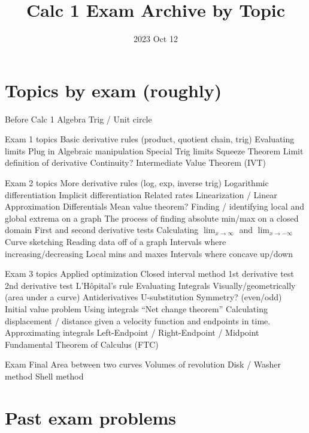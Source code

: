 \documentclass[10pt]{scrartcl}
\title{Calc 1 Exam Archive by Topic}
\date{
  2023 Oct 12 
}
\theoremstyle{definition}
\begin{document}
\maketitle
\tableofcontents

\part{Topics by exam (roughly)}
\begin{outline}
  \1 Before Calc 1
  \2 Algebra
  \2 Trig / Unit circle

  \1 Exam 1 topics
  \2 Basic derivative rules (product, quotient chain, trig)
  \2 Evaluating limits
  \3 Plug in
  \3 Algebraic manipulation
  \3 Special Trig limits
  \3 Squeeze Theorem
  \2 Limit definition of derivative
  \2 Continuity?
  \2 Intermediate
  Value Theorem (IVT)

  \1 Exam 2 topics
    \2 More derivative rules (log, exp, inverse trig)
    \2 Logarithmic differentiation
    \2 Implicit differentiation
    \2 Related rates
    \2 Linearization / Linear Approximation
    \2 Differentials
    \2 Mean value theorem?
    \2 Finding / identifying local and global extrema on a graph
    \2 The process of finding absolute min/max on a closed domain
    \2 First and second derivative tests
    \2 Calculating $\lim_{x\to\infty}$ and $\lim_{x\to-\infty}$
    \2 Curve sketching
    \2 Reading data off of a graph
      \3 Intervals where increasing/decreasing
      \3 Local mins and maxes
      \3 Intervals where concave up/down

  \1 Exam 3 topics
    \2 Applied optimization
      \3 Closed interval method
      \3 1st derivative test
      \3 2nd derivative test
    \2 L'H\^{o}pital's rule
    \2 Evaluating Integrals
      \3 Visually/geometrically (area under a curve)
      \3 Antiderivatives
      \3 U-substitution
      \3 Symmetry? (even/odd)
      \3 Initial value problem
    \2 Using integrals
      \3 ``Net change theorem''
      \3 Calculating displacement / distance given a velocity function and endpoints in time.
    \2 Approximating integrals
      \3 Left-Endpoint / Right-Endpoint / Midpoint
    \2 Fundamental Theorem of Calculus (FTC)

  \1 Exam Final
    \2 Area between two curves
    \2 Volumes of revolution
      \3 Disk / Washer method
      \3 Shell method
\end{outline}


\part{Past exam problems}
\end{document}

